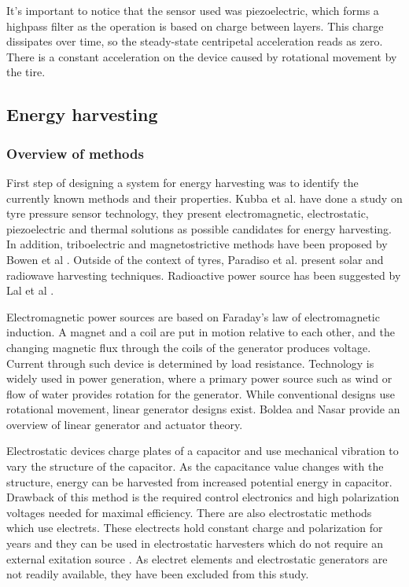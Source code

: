 It's important to notice that the sensor used was piezoelectric, which forms a highpass filter as the operation is based on charge between layers. This charge dissipates over time, so the steady-state centripetal acceleration reads as zero. There is a constant acceleration on the device caused by rotational movement by the tire. 

\subsection{Energy harvesting}
\subsubsection{Overview of methods}
First step of designing a system for energy harvesting was to identify the currently known methods and their properties. Kubba et al. \cite{Kubba2014} have done a study on tyre pressure sensor technology, they present electromagnetic, electrostatic, piezoelectric and thermal solutions as possible candidates for energy harvesting. In addition, triboelectric and magnetostrictive methods have been proposed by Bowen et al \cite{Bowen2014}. Outside of the context of tyres, Paradiso et al. \cite{Paradiso2005} present solar and radiowave harvesting techniques. Radioactive power source has been suggested by Lal et al \cite{Lal2004}. 

Electromagnetic power sources are based on Faraday's law of electromagnetic induction. A magnet and a coil are put in motion relative to each other, and the changing magnetic flux through the coils of the generator produces voltage. Current through such device is determined by load resistance. Technology is widely used in power generation, where a primary power source such as wind or flow of water provides rotation for the generator. While conventional designs use rotational movement, linear generator designs exist. Boldea and Nasar \cite{Boldea1999} provide an overview of linear generator and actuator theory. 

Electrostatic devices charge plates of a capacitor and use mechanical vibration to vary the structure of the capacitor. As the capacitance value changes with the structure, energy can be harvested from increased potential energy in capacitor. Drawback of this method is the required control electronics and high polarization voltages needed for maximal efficiency. There are also electrostatic methods which use electrets. These electrects hold constant charge and polarization for years and they can be used in electrostatic harvesters which do not require an external exitation source \cite{Boisseau2012}. As electret elements and electrostatic generators are not readily available, they have been excluded from this study.

